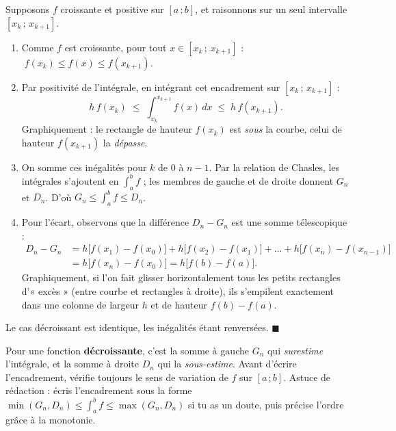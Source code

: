 \documentclass[11pt]{article}
\begin{document}
\begin{experience}
Supposons $f$ croissante et positive sur $[a\,;b]$, et raisonnons sur un seul intervalle $[x_k\,;\,x_{k+1}]$.
\begin{enumerate}
\item Comme $f$ est croissante, pour tout $x\in[x_k\,;\,x_{k+1}]$ : $\; f(x_k)\le f(x)\le f(x_{k+1})$.
\item Par positivité de l'intégrale, en intégrant cet encadrement sur $[x_k\,;\,x_{k+1}]$ :
\[ h\,f(x_k) \;\le\; \int_{x_k}^{x_{k+1}} f(x)\,dx \;\le\; h\,f(x_{k+1}). \]
Graphiquement : le rectangle de hauteur $f(x_k)$ est \emph{sous} la courbe, celui de hauteur $f(x_{k+1})$ la \emph{dépasse}.
\item On somme ces inégalités pour $k$ de $0$ à $n-1$. Par la relation de Chasles, les intégrales s'ajoutent en $\displaystyle\int_a^b f$ ; les membres de gauche et de droite donnent $G_n$ et $D_n$. D'où $G_n\le \displaystyle\int_a^b f \le D_n$.
\item Pour l'écart, observons que la différence $D_n-G_n$ est une somme télescopique :
\begin{align*}
D_n - G_n &= h\big[f(x_1)-f(x_0)\big] + h\big[f(x_2)-f(x_1)\big] + \dots + h\big[f(x_n)-f(x_{n-1})\big] \\
&= h\big[f(x_n)-f(x_0)\big] = h\big[f(b)-f(a)\big].
\end{align*}
Graphiquement, si l'on fait glisser horizontalement tous les petits rectangles d'« excès » (entre courbe et rectangles à droite), ils s'empilent exactement dans une colonne de largeur $h$ et de hauteur $f(b)-f(a)$.
\end{enumerate}
Le cas décroissant est identique, les inégalités étant renversées. \hfill$\blacksquare$
\end{experience}

\begin{attention}
Pour une fonction \textbf{décroissante}, c'est la somme à gauche $G_n$ qui \emph{surestime} l'intégrale, et la somme à droite $D_n$ qui la \emph{sous-estime}. Avant d'écrire l'encadrement, vérifie toujours le sens de variation de $f$ sur $[a\,;b]$. Astuce de rédaction : écris l'encadrement sous la forme $\min(G_n,D_n)\le \displaystyle\int_a^b f\le \max(G_n,D_n)$ si tu as un doute, puis précise l'ordre grâce à la monotonie.
\end{attention}
\end{document}
